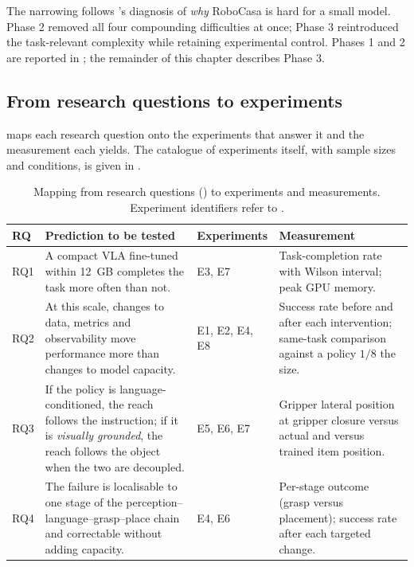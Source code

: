 The narrowing follows 's diagnosis of \emph{why} RoboCasa is hard
for a small model. Phase 2 removed all four compounding difficulties at once; Phase 3
reintroduced the task-relevant complexity while retaining experimental control. Phases 1
and 2 are reported in ; the remainder of this chapter
describes Phase 3.

\subsection{From research questions to experiments}
\label{sec:m-rq-map}
 maps each research question onto the experiments that answer it
and the measurement each yields. The catalogue of experiments itself, with sample
sizes and conditions, is given in .

\begin{table}[ht]
\caption{Mapping from research questions () to experiments and
measurements. Experiment identifiers refer to .}
\begin{center}
\begin{tabular}{p{}p{}p{}p{}}
\toprule
RQ & Prediction to be tested & Experiments & Measurement \\
\midrule
RQ1 & A compact VLA fine-tuned within \SI{12}{GB} completes the task more often than
not. & E3, E7 & Task-completion rate with Wilson interval; peak GPU memory. \\
\addlinespace
RQ2 & At this scale, changes to data, metrics and observability move performance more
than changes to model capacity. & E1, E2, E4, E8 & Success rate before and after each
intervention; same-task comparison against a policy $1/8$ the size. \\
\addlinespace
RQ3 & If the policy is language-conditioned, the reach follows the instruction; if it
is \emph{visually grounded}, the reach follows the object when the two are decoupled.
& E5, E6, E7 & Gripper lateral position at gripper closure versus actual and versus
trained item position. \\
\addlinespace
RQ4 & The failure is localisable to one stage of the
perception--language--grasp--place chain and correctable without adding capacity. &
E4, E6 & Per-stage outcome (grasp versus placement); success rate after each targeted
change. \\
\bottomrule
\end{tabular}
\end{center}
\label{tab:rqmap}
\end{table}

